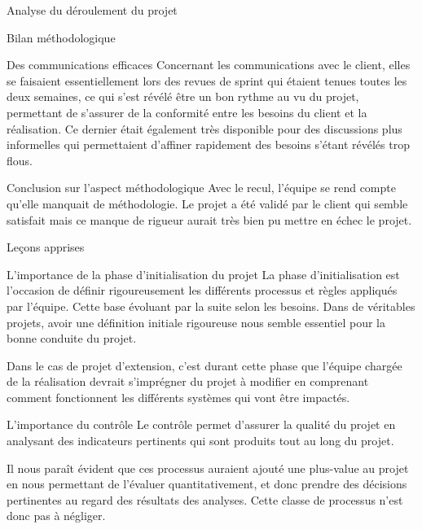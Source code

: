 \documentclass[]{article}
\begin{document}
{\begin{section}{Analyse du déroulement du projet}
\begin{subsection}{Bilan méthodologique}
\begin{subsubsection}{Des communications efficaces}
         Concernant les communications avec le client, elles se faisaient essentiellement lors des revues de sprint qui étaient tenues toutes les deux semaines, ce qui s'est révélé être un bon rythme au vu du projet, permettant de s'assurer de la conformité entre les besoins du client et la réalisation. Ce dernier était également très disponible pour des discussions plus informelles qui permettaient d'affiner rapidement des besoins s'étant révélés trop flous.
     \end{subsubsection}

     \begin{subsubsection}{Conclusion sur l'aspect méthodologique}
        Avec le recul, l'équipe se rend compte qu'elle manquait de méthodologie. Le projet a été validé par le client qui semble satisfait mais ce manque de rigueur aurait très bien pu mettre en échec le projet.
     \end{subsubsection}
 \end{subsection}
\end{section}

\begin{section}{Leçons apprises}
 \begin{subsection}{L'importance de la phase d'initialisation du projet}
     La phase d'initialisation est l'occasion de définir rigoureusement les différents processus et règles appliqués par l'équipe. Cette base évoluant par la suite selon les besoins. Dans de véritables projets, avoir une définition initiale rigoureuse nous semble essentiel pour la bonne conduite du projet.

     Dans le cas de projet d'extension, c'est durant cette phase que l'équipe chargée de la réalisation devrait s'imprégner du projet à modifier en comprenant comment fonctionnent les différents systèmes qui vont être impactés.
 \end{subsection}

 \begin{subsection}{L'importance du contrôle}
     Le contrôle permet d'assurer la qualité du projet en analysant des indicateurs pertinents qui sont produits tout au long du projet.

     Il nous paraît évident que ces processus auraient ajouté une plus-value au projet en nous permettant de l'évaluer quantitativement, et donc prendre des décisions pertinentes au regard des résultats des analyses. Cette classe de processus n'est donc pas à négliger.
 \end{subsection}


\end{section}}
\end{document}
